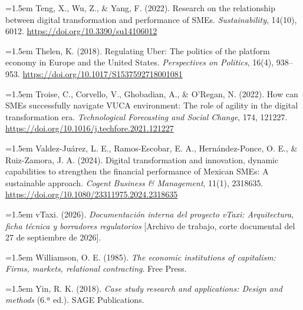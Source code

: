 {\hangindent=1.5em Teng, X., Wu, Z., \& Yang, F. (2022). Research on the relationship between digital transformation and performance of SMEs. \textit{Sustainability}, 14(10), 6012. \url{https://doi.org/10.3390/su14106012}

\hangindent=1.5em Thelen, K. (2018). Regulating Uber: The politics of the platform economy in Europe and the United States. \textit{Perspectives on Politics}, 16(4), 938--953. \url{https://doi.org/10.1017/S1537592718001081}

\hangindent=1.5em Troise, C., Corvello, V., Ghobadian, A., \& O'Regan, N. (2022). How can SMEs successfully navigate VUCA environment: The role of agility in the digital transformation era. \textit{Technological Forecasting and Social Change}, 174, 121227. \url{https://doi.org/10.1016/j.techfore.2021.121227}

\hangindent=1.5em Valdez-Juárez, L. E., Ramos-Escobar, E. A., Hernández-Ponce, O. E., \& Ruiz-Zamora, J. A. (2024). Digital transformation and innovation, dynamic capabilities to strengthen the financial performance of Mexican SMEs: A sustainable approach. \textit{Cogent Business \& Management}, 11(1), 2318635. \url{https://doi.org/10.1080/23311975.2024.2318635}

\hangindent=1.5em vTaxi. (2026). \textit{Documentación interna del proyecto vTaxi: Arquitectura, ficha técnica y borradores regulatorios} [Archivo de trabajo, corte documental del 27 de septiembre de 2026].

\hangindent=1.5em Williamson, O. E. (1985). \textit{The economic institutions of capitalism: Firms, markets, relational contracting}. Free Press.

\hangindent=1.5em Yin, R. K. (2018). \textit{Case study research and applications: Design and methods} (6.ª ed.). SAGE Publications.
\endgroup

\begin{aulatexlandscape}

\end{aulatexlandscape}}
